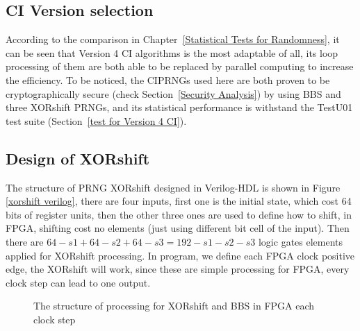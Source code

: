 \subsection{CI Version selection}
According to the comparison in Chapter~\ref{Statistical Tests for Randomness}, it can be seen that Version 4 CI algorithms is the most adaptable of all, its loop processing of them are both able to be replaced by parallel computing to increase the efficiency. To be noticed, the CIPRNGs used here are both proven to be cryptographically secure (check Section~\ref{Security Analysis}) by using BBS and three XORshift PRNGs, and its statistical performance is withstand the TestU01 test suite (Section~\ref{test for Version 4 CI}).
\subsection{Design of XORshift}
The structure of PRNG XORshift designed in Verilog-HDL is shown in Figure
\ref{xorshift verilog}, there are four inputs, first one is the initial state, which cost 64 bits 
of register units, then the other three ones are used to define how to shift, in FPGA, shifting cost no 
elements (just using different bit cell of the input). Then there are $64 - s1 + 64 -s2 + 64 -s3 
= 192 - s1 - s2 - s3$ logic gates elements applied for XORshift processing. In program, we define 
each FPGA clock positive edge, the XORshift will work, since these are simple processing for FPGA, every 
clock step can lead to one output.
\begin{figure}
\begin{center}
\end{center}
\caption{The structure of processing for XORshift and BBS in FPGA each clock step}
\end{figure}

